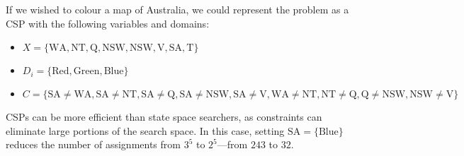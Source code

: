 \begin{example}
    If we wished to colour a map of Australia, we could represent the problem as a CSP with the following variables and domains:\\
    \begin{itemize}
        \item $X = \{ \text{WA}, \text{NT}, \text{Q}, \text{NSW}, \text{NSW}, \text{V}, \text{SA}, \text{T} \}$
        \item $D_{i} = \{ \text{Red}, \text{Green}, \text{Blue} \}$
        \item $C = \{ \text{SA} \neq \text{WA}, \text{SA} \neq \text{NT}, \text{SA} \neq \text{Q}, \text{SA} \neq \text{NSW}, \text{SA} \neq \text{V}, \text{WA} \neq \text{NT}, \text{NT} \neq \text{Q}, \text{Q} \neq \text{NSW}, \text{NSW} \neq \text{V} \}$
    \end{itemize}
    CSPs can be more efficient than state space searchers, as constraints can eliminate large portions of the search space. In this case, setting $\text{SA} = \{ \text{Blue} \}$ reduces the number of assignments from $3^{5}$ to $2^{5}$---from $243$ to $32$.
\end{example}
\pagebreak
